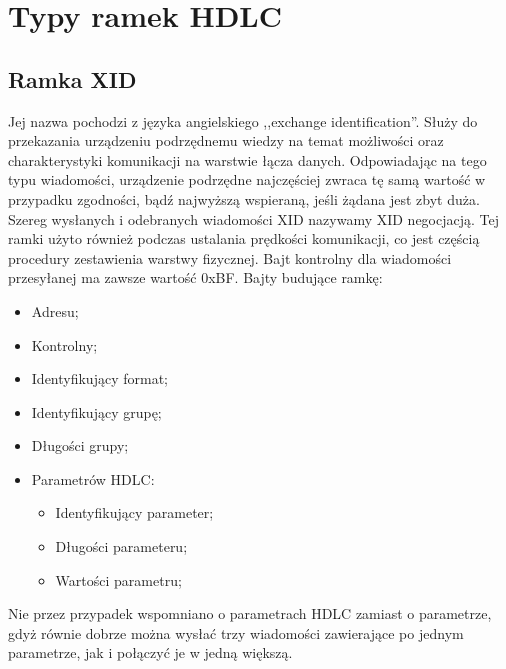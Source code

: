 \section{Typy ramek HDLC}
	\subsection{Ramka XID}
	Jej nazwa pochodzi z języka angielskiego ,,exchange identification''. 
	Służy do przekazania urządzeniu podrzędnemu wiedzy na temat możliwości oraz charakterystyki komunikacji na warstwie łącza danych.
	Odpowiadając na tego typu wiadomości, urządzenie podrzędne najczęściej zwraca tę samą wartość w przypadku zgodności, 
	bądź najwyższą wspieraną, jeśli żądana jest zbyt duża. Szereg wysłanych i odebranych wiadomości XID nazywamy XID negocjacją.
	Tej ramki użyto również podczas ustalania prędkości komunikacji, co jest częścią procedury zestawienia warstwy fizycznej.
	Bajt kontrolny dla wiadomości przesyłanej ma zawsze wartość 0xBF. \newline
	Bajty budujące ramkę:
	\begin{itemize}
		\item Adresu;
		\item Kontrolny;
		\item Identyfikujący format;
		\item Identyfikujący grupę;
		\item Długości grupy;
		\item Parametrów HDLC:
		\begin{itemize}
			\item Identyfikujący parameter;
			\item Długości parameteru;
			\item Wartości parametru;
		\end{itemize}
	\end{itemize} 
	Nie przez przypadek wspomniano o parametrach HDLC zamiast o parametrze, gdyż równie dobrze można wysłać
    trzy wiadomości zawierające po jednym parametrze, jak i połączyć je w jedną większą.
	